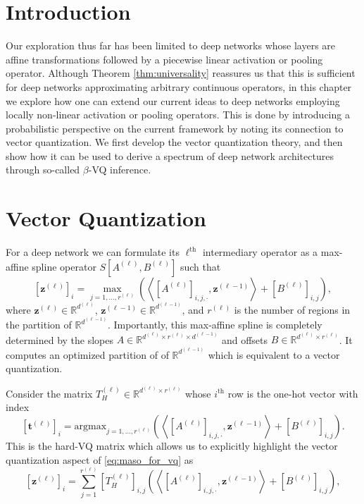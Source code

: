 \section{Introduction}

Our exploration thus far has been limited to deep networks whose layers are affine transformations followed by a piecewise linear activation or pooling operator. Although Theorem \ref{thm:universality} reassures us that this is sufficient for deep networks approximating arbitrary continuous operators, in this chapter we explore how one can extend our current ideas to deep networks employing locally non-linear activation or pooling operators. This is done by introducing a probabilistic perspective on the current framework by noting its connection to vector quantization. We first develop the vector quantization theory, and then show how it can be used to derive a spectrum of deep network architectures through so-called $\beta$-VQ inference.

\section{Vector Quantization}\label{sec:vector_quantization}

For a deep network we can formulate its $\ell^{\text{th}}$ intermediary operator as a max-affine spline operator $S\left[A^{(\ell)},B^{(\ell)}\right]$ such that 
\begin{equation}\label{eq:maso_for_vq}
    \left[\mathbf{z}^{(\ell)}\right]_i=\max_{j=1,\dots,r^{(\ell)}}\left(\left\langle\left[A^{(\ell)}\right]_{i,j,\cdot},\mathbf{z}^{(\ell-1)}\right\rangle+\left[B^{(\ell)}\right]_{i,j}\right),
\end{equation}
where $\mathbf{z}^{(\ell)}\in\mathbb{R}^{d^{(\ell)}}$, $\mathbf{z}^{(\ell-1)}\in\mathbb{R}^{d^{(\ell-1)}}$, and $r^{(\ell)}$ is the number of regions in the partition of $\mathbb{R}^{d^{(\ell-1)}}$. Importantly, this max-affine spline is completely determined by the slopes $A\in\mathbb{R}^{d^{(\ell)}\times r^{(\ell)}\times d^{(\ell-1)}}$ and offsets $B\in\mathbb{R}^{d^{(\ell)}\times r^{(\ell)}}$. It computes an optimized partition of of $\mathbb{R}^{d^{(\ell-1)}}$ which is equivalent to a vector quantization.

Consider the matrix $T_H^{(\ell)}\in\mathbb{R}^{d^{(\ell)}\times r^{(\ell)}}$ whose $i^\text{th}$ row is the one-hot vector with index $$\left[\mathbf{t}^{(\ell)}\right]_i=\mathrm{argmax}_{j=1,\dots,r^{(\ell)}}\left(\left\langle\left[A^{(\ell)}\right]_{i,j,\cdot},\mathbf{z}^{(\ell-1)}\right\rangle+\left[B^{(\ell)}\right]_{i,j}\right).$$ This is the hard-VQ matrix which allows us to explicitly highlight the vector quantization aspect of \eqref{eq:maso_for_vq} as
\begin{equation}\label{eq:maso_as_vq}
    \left[\mathbf{z}^{(\ell)}\right]_i=\sum_{j=1}^{r^{(\ell)}}\left[T_H^{(\ell)}\right]_{i,j}\left(\left\langle\left[A^{(\ell)}\right]_{i,j,\cdot},\mathbf{z}^{(\ell-1)}\right\rangle+\left[B^{(\ell)}\right]_{i,j}\right),
\end{equation}

